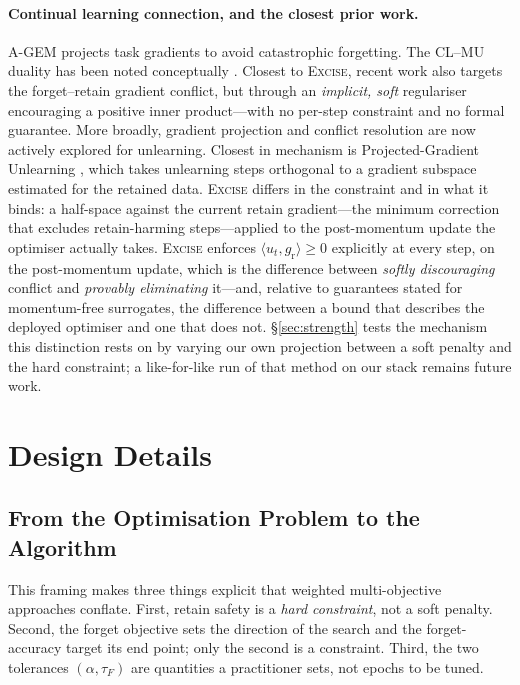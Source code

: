 \documentclass{article}
\newcommand{\ours}{\textsc{Excise}}
\newcommand{\gr}{g_{\mathrm{r}}}
\newcommand{\added}[1]{{\color{revised}#1}}
\newcommand{\rev}[1]{{\color{revisedB}#1}}
\theoremstyle{remark}
\theoremstyle{plain}
\begin{document}
\paragraph{Continual learning connection, and the closest prior work.}
A-GEM \citep{chaudhry2019agem} projects task gradients to avoid catastrophic
forgetting. The CL--MU duality has been noted conceptually
\citep{nguyen2020variational,kurmanji2023unbounded}. Closest to \ours{}, recent
work \citep{patel2025learning} also targets the forget--retain gradient
conflict, but through an \emph{implicit, soft} regulariser encouraging a positive
inner product---with no per-step constraint and no formal guarantee. More
broadly, gradient projection and conflict resolution are now actively explored
for unlearning. \added{Closest in mechanism is Projected-Gradient Unlearning
\citep{hoang2024learn}, which takes unlearning steps orthogonal to a gradient
subspace estimated for the retained data. \ours{} differs in the constraint and in
what it binds: a half-space against the current retain gradient---the minimum
correction that excludes retain-harming steps---applied to the post-momentum
update the optimiser actually takes.} \ours{} enforces $\langle u_t,\gr\rangle \ge 0$ explicitly at every
step, on the post-momentum update, which is the difference between \emph{softly
discouraging} conflict and \emph{provably eliminating} it---and, relative to
guarantees stated for momentum-free surrogates, the difference between a bound
that describes the deployed optimiser and one that does not.
\S\ref{sec:strength} tests the mechanism this distinction rests on by varying
our own projection between a soft penalty and the hard constraint; a
like-for-like run of that method on our stack remains future work.

\section{Design Details}\label{app:method}

\subsection{From the Optimisation Problem to the Algorithm}

This framing makes three things explicit that weighted multi-objective
approaches conflate. First, retain safety is a \emph{hard constraint}, not a
soft penalty. Second, \rev{the forget objective sets the direction of the
search and the forget-accuracy target its end point; only the second is a
constraint}. Third, the two tolerances \rev{$(\alpha, \tau_F)$} are quantities a
practitioner sets, not epochs to be tuned.
\end{document}
